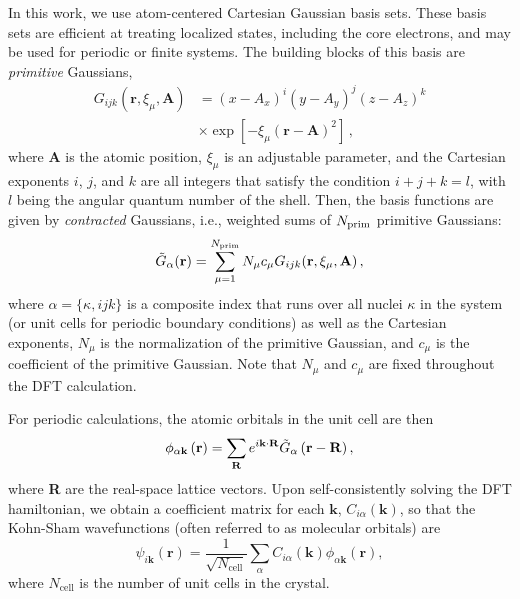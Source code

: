 \documentclass[
    prd, twocolumn, superscriptaddress, nofootinbib, amsmath, amssymb,
    aps, floatfix,preprintnumbers
]{revtex4-2}
\begin{document}
        In this work, we use atom-centered Cartesian Gaussian basis sets. These basis sets are efficient at treating localized states, including the core electrons, and may be used for periodic or finite systems. The building blocks of this basis are \emph{primitive} Gaussians,
        \begin{equation}\label{eq:cartestian_gauss}
            \begin{split}
                G_{ijk} (\mathbf{r}, \xi_\mu, \mathbf{A}) &= (x - A_x)^i (y - A_y)^j (z - A_z)^k \\
                &\times \exp[ - \xi_\mu (\mathbf{r} - \mathbf{A})^2]\,,
            \end{split}
        \end{equation}
        where \textbf{A} is the atomic position, $\xi_\mu$ is an adjustable parameter, and the Cartesian exponents $i$, $j$, and $k$ are all integers that satisfy the condition $i+j+k = l$, with $l$ being the angular quantum number of the shell. Then, the basis functions are given by \emph{contracted} Gaussians, i.e., weighted sums of $N_{\rm prim}$ primitive Gaussians:
        \begin{equation}
            \Tilde{G}_{\alpha} (\mathbf{r}) = \sum_{\mu = 1}^{N_{\rm prim}}N_\mu c_\mu G_{ijk}(\mathbf{r}, \xi_\mu, \mathbf{A})\,,
        \end{equation}
       where $\alpha=\{\kappa,ijk\}$ is a composite index that runs over all nuclei $\kappa$ in the system (or unit cells for periodic boundary conditions) as well as the Cartesian exponents, $N_\mu$ is the normalization of the primitive Gaussian, and $c_\mu$ is the coefficient of the primitive Gaussian. Note that $N_\mu$ and $c_\mu$ are fixed throughout the DFT calculation.
        
        For periodic calculations, the atomic orbitals in the unit cell are then
        \begin{equation}\label{eq:blochsum}
            \phi_{\alpha \mathbf{k}}\left(\mathbf{r}\right) = \sum_\mathbf{R} e^{i\mathbf{k}\cdot\mathbf{R}}\Tilde{G}_\alpha\left(\mathbf{r - R}\right),
        \end{equation}
        where \textbf{R} are the real-space lattice vectors. Upon self-consistently solving the DFT hamiltonian, we obtain a coefficient matrix for each $\mathbf{k}$, $C_{i\alpha} (\mathbf{k})$, so that the Kohn-Sham wavefunctions (often referred to as molecular orbitals) are
        \begin{equation}\label{eq:molecularorbitals}
            \psi_{i\mathbf{k}} (\mathbf{r}) = \frac{1}{\sqrt{N_\mathrm{cell}}}\sum_\alpha C_{i\alpha}(\mathbf{k}) \phi_{\alpha\mathbf{k}} (\mathbf{r}),
        \end{equation}
        where $N_\mathrm{cell}$ is the number of unit cells in the crystal.
        
\end{document}
